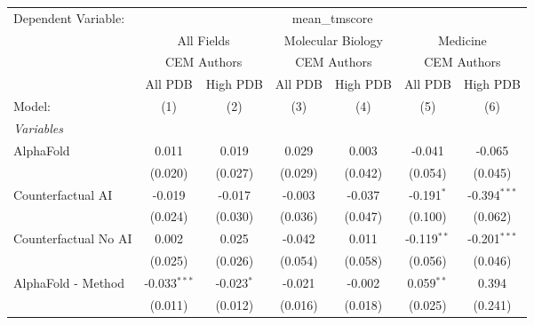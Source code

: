 \begingroup
\centering
\begin{tabular}{lcccccc}
   \tabularnewline \midrule \midrule
   Dependent Variable: & \multicolumn{6}{c}{mean\_tmscore}\\
 & \multicolumn{2}{c}{All Fields} & \multicolumn{2}{c}{Molecular Biology} & \multicolumn{2}{c}{Medicine} \\
\cmidrule(lr){2-3} \cmidrule(lr){4-5} \cmidrule(lr){6-7}
 & \multicolumn{2}{c}{CEM Authors} & \multicolumn{2}{c}{CEM Authors} & \multicolumn{2}{c}{CEM Authors} \\
\cmidrule(lr){2-3} \cmidrule(lr){4-5} \cmidrule(lr){6-7}
 & \multicolumn{1}{c}{All PDB} & \multicolumn{1}{c}{High PDB} & \multicolumn{1}{c}{All PDB} & \multicolumn{1}{c}{High PDB} & \multicolumn{1}{c}{All PDB} & \multicolumn{1}{c}{High PDB} \\
\cmidrule(lr){2-2} \cmidrule(lr){3-3} \cmidrule(lr){4-4} \cmidrule(lr){5-5} \cmidrule(lr){6-6} \cmidrule(lr){7-7}
   Model:                                                     & (1)            & (2)          & (3)         & (4)     & (5)           & (6)\\  
   \midrule
   \emph{Variables}\\
   AlphaFold                                                  & 0.011          & 0.019        & 0.029       & 0.003   & -0.041        & -0.065\\   
                                                              & (0.020)        & (0.027)      & (0.029)     & (0.042) & (0.054)       & (0.045)\\   
   Counterfactual AI                                          & -0.019         & -0.017       & -0.003      & -0.037  & -0.191$^{*}$  & -0.394$^{***}$\\   
                                                              & (0.024)        & (0.030)      & (0.036)     & (0.047) & (0.100)       & (0.062)\\   
   Counterfactual No AI                                       & 0.002          & 0.025        & -0.042      & 0.011   & -0.119$^{**}$ & -0.201$^{***}$\\   
                                                              & (0.025)        & (0.026)      & (0.054)     & (0.058) & (0.056)       & (0.046)\\   
   AlphaFold - Method                                         & -0.033$^{***}$ & -0.023$^{*}$ & -0.021      & -0.002  & 0.059$^{**}$  & 0.394\\   
                                                              & (0.011)        & (0.012)      & (0.016)     & (0.018) & (0.025)       & (0.241)\\   

\end{tabular}
